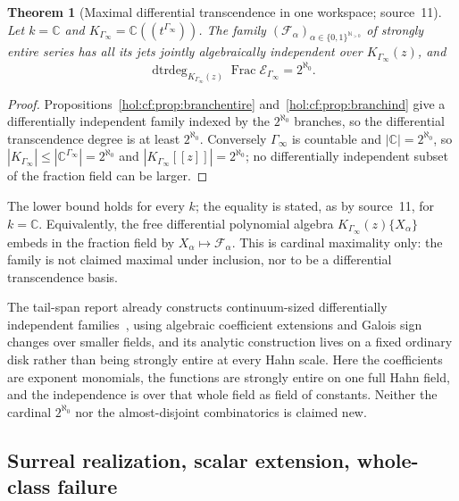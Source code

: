 \documentclass[11pt]{article}
\numberwithin{equation}{section}
\newtheorem{theorem}{Theorem}[section]
\theoremstyle{definition}
\theoremstyle{remark}
\newcommand{\C}{\mathbb C}
\newcommand{\N}{\mathbb N}
\newcommand{\dtrdeg}{\operatorname{dtrdeg}}
\begin{document}
\begin{theorem}[Maximal differential transcendence in one workspace;
source~11]\label{hol:cf:thm:continuum}
Let $k=\C$ and $K_{\Gamma_\infty}=\C((t^{\Gamma_\infty}))$. The family
$(\mathcal F_\alpha)_{\alpha\in\{0,1\}^{\N_{>0}}}$ of strongly entire series has
all its jets jointly algebraically independent over $K_{\Gamma_\infty}(z)$,
and
\begin{equation}\label{hol:cf:eq:dtrdeg}
 \dtrdeg_{K_{\Gamma_\infty}(z)}\operatorname{Frac}\mathcal E_{\Gamma_\infty}
 =2^{\aleph_0}.
\end{equation}
\end{theorem}

\begin{proof}
Propositions~\ref{hol:cf:prop:branchentire} and~\ref{hol:cf:prop:branchind}
give a differentially independent family indexed by the $2^{\aleph_0}$
branches, so the differential transcendence degree is at least $2^{\aleph_0}$.
Conversely $\Gamma_\infty$ is countable and $|\C|=2^{\aleph_0}$, so
$|K_{\Gamma_\infty}|\le|\C^{\Gamma_\infty}|=2^{\aleph_0}$ and
$|K_{\Gamma_\infty}[[z]]|=2^{\aleph_0}$; no differentially independent subset
of the fraction field can be larger.
\end{proof}

The lower bound holds for every $k$; the equality is stated, as by source~11,
for $k=\C$. Equivalently, the free differential polynomial algebra
$K_{\Gamma_\infty}(z)\{X_\alpha\}$ embeds in the fraction field by
$X_\alpha\mapsto\mathcal F_\alpha$. This is cardinal maximality only: the family
is not claimed maximal under inclusion, nor to be a differential
transcendence basis.

The tail-span report already constructs continuum-sized differentially
independent families~\cite{repotail}, using algebraic coefficient extensions
and Galois sign changes over smaller fields, and its analytic construction
lives on a fixed ordinary disk rather than being strongly entire at every Hahn
scale. Here the coefficients are exponent monomials, the functions are
strongly entire on one full Hahn field, and the independence is over that
whole field as field of constants. Neither the cardinal $2^{\aleph_0}$ nor the
almost-disjoint combinatorics is claimed new.

\subsection{Surreal realization, scalar extension, whole-class failure}
\label{hol:cf:sub:surreal}
\end{document}

